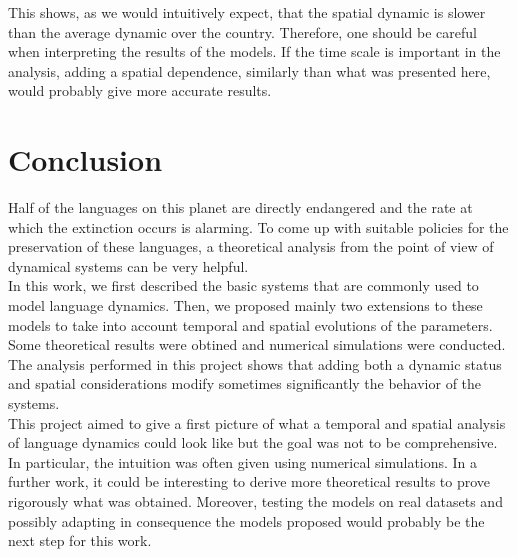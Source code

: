 \documentclass{article}
\begin{document}
This shows, as we would intuitively expect, that the spatial dynamic is slower than the average dynamic over the country.
Therefore, one should be careful when interpreting the results of the models.
If the time scale is important in the analysis, adding a spatial dependence, similarly than what was presented here, would probably give more accurate results.

\newpage
\section{Conclusion}
\label{sec:conclusion}
Half of the languages on this planet are directly endangered and the rate at which the extinction occurs is alarming.
To come up with suitable policies for the preservation of these languages, a theoretical analysis from the point of view of dynamical systems can be very helpful. \\
In this work, we first described the basic systems that are commonly used to model language dynamics.
Then, we proposed mainly two extensions to these models to take into account temporal and spatial evolutions of the parameters.
Some theoretical results were obtined and numerical simulations were conducted. \\
The analysis performed in this project shows that adding both a dynamic status and spatial considerations modify sometimes significantly the behavior of the systems. \\
This project aimed to give a first picture of what a temporal and spatial analysis of language dynamics could look like but the goal was not to be comprehensive. In particular, the intuition was often given using numerical simulations. In a further work, it could be interesting to derive more theoretical results to prove rigorously what was obtained. Moreover, testing the models on real datasets and possibly adapting in consequence the models proposed would probably be the next step for this work.




\end{document}

